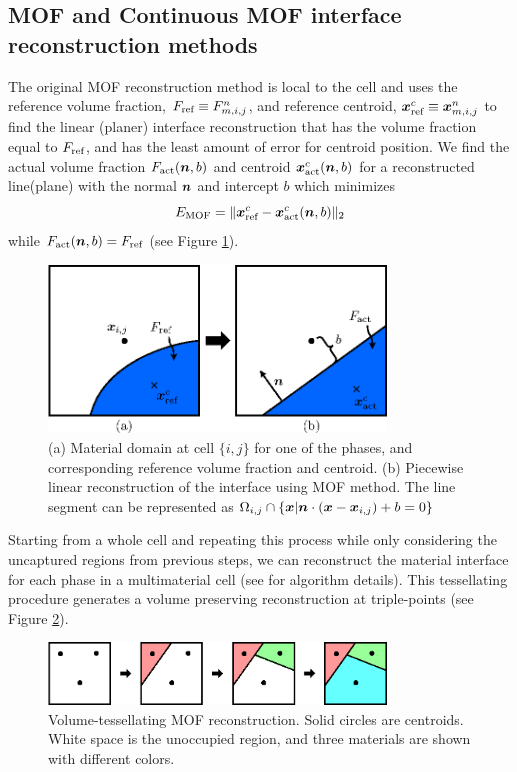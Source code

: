 \documentclass[]{article}
\newcommand{\tn}{\textnormal}
\newcommand{\bmx}{\mbox{\boldmath $x$\unboldmath}}
\newcommand{\bmn}{\mbox{\boldmath $n$\unboldmath}}
\begin{document}
\subsection{MOF and Continuous MOF interface reconstruction methods
  \label{MOF_vs_CMOF_sec} }
The original MOF reconstruction method is local to the cell and 
uses the reference volume fraction, $F_\tn{ref} \equiv F_{m,i,j}^n$, 
and reference centroid, $\bmx_\tn{ref}^c \equiv \bmx_{m,i,j}^n$ to 
find the linear (planer) interface reconstruction that has the volume
fraction equal to $F_\tn{ref}$, and has the least amount of error 
for centroid position. We find the actual volume fraction 
$F_\tn{act}(\bmn,b)$ and centroid $\bmx_\tn{act}^c(\bmn,b)$ 
for a reconstructed line(plane) with the normal $\bmn$ and 
intercept $b$ which minimizes
\begin{equation}
  E_\tn{MOF} = \lVert \bmx_\tn{ref}^c - \bmx_\tn{act}^c(\bmn,b) \rVert_2
\end{equation}
while $F_\tn{act}(\bmn,b) = F_\tn{ref}$ (see Figure
\ref{fig:mof_reconstruction}).
\begin{figure}[htbp]
  \centering
  \includegraphics[width=0.8\textwidth]{mof_reconstruction.eps}
  \caption{(a) Material domain at cell $\{i,j\}$ for one of the 
phases, and corresponding reference volume fraction and centroid. 
(b) Piecewise linear reconstruction of the interface using MOF 
method. The line segment can be represented as 
$\Omega_{i,j} \cap \{ \bmx | \bmn \cdot (\bmx - \bmx_{i,j}) + b = 0 \}$}
  \label{fig:mof_reconstruction}
\end{figure}
Starting from a whole cell and repeating this process 
while only considering the uncaptured regions from previous 
steps, we can reconstruct the material interface for 
each phase in a multimaterial cell (see \cite{li2015multiphase} 
for algorithm details). This tessellating procedure 
generates a volume preserving reconstruction 
at triple-points (see Figure \ref{fig:mof_tes_nontes}).
\begin{figure}[htbp]
  \centering
  \includegraphics[width=0.8\textwidth]{mof_tes.eps}
  \caption{ Volume-tessellating MOF reconstruction. 
Solid circles are centroids. White space is the unoccupied 
region, and three materials are shown with different colors.}
  \label{fig:mof_tes_nontes}
\end{figure}
\end{document}

